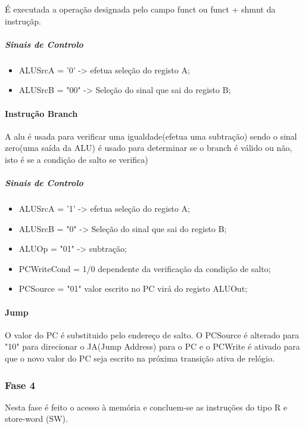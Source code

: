 \documentclass[10pt,a4paper]{book}
\begin{document}
			É executada a operação designada pelo campo funct ou funct + shmnt da instruçãp.

			\subparagraph{Sinais de Controlo}

			\begin{itemize}
				\item ALUSrcA = '0' -> efetua seleção do registo A;
				\item ALUSrcB = "00" -> Seleção do sinal que sai do registo B;
			\end{itemize}

			\paragraph{Instrução Branch}

			A alu é usada para verificar uma igualdade(efetua uma subtração) sendo o sinal zero(uma saída da ALU) é usado para determinar se o branch é válido ou não, isto é se a condição de salto se verifica)
			\subparagraph{Sinais de Controlo}

			\begin{itemize}
				\item ALUSrcA = '1' -> efetua seleção do registo A;
				\item ALUSrcB = "0" -> Seleção do sinal que sai do registo B;
				\item ALUOp = "01" -> subtração;
				\item PCWriteCond = 1/0 dependente da verificação da condição de salto;
				\item PCSource = "01" valor escrito no PC virá do registo ALUOut;

			\end{itemize}


			\paragraph{Jump}

			O valor do PC é substituido pelo endereço de salto. O PCSource é alterado para "10" para direcionar o JA(Jump Address) para o PC e o PCWrite é ativado para que o novo valor do PC seja escrito na próxima transição ativa de relógio.


			\subsubsection{Fase 4}

			Nesta fase é feito o acesso à memória e concluem-se as instruções do tipo R e  store-word (SW).
\end{document}
